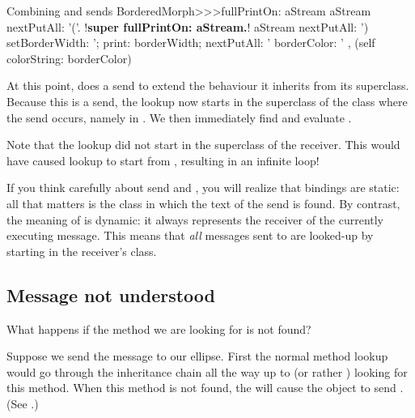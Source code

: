 \documentclass[a4paper,10pt,twoside]{book}
\begin{document}
\begin{method}[fullPrintOn]{Combining \super and \self sends}
BorderedMorph>>>fullPrintOn: aStream
	aStream nextPutAll: '('.
	!\textbf{super fullPrintOn: aStream.}!
	aStream nextPutAll: ') setBorderWidth: '; print: borderWidth;
		nextPutAll: ' borderColor: ' , (self colorString: borderColor)
\end{method}
At this point,  does a \super send to extend the 
 behaviour it inherits from its superclass.
Because this is a \super send, the lookup now starts in the superclass of the class where the \super send occurs, namely in .
We then immediately find and evaluate .

Note that the \super lookup did not start in the superclass of the receiver.
This would have caused lookup to start from , resulting in an infinite loop!


If you think carefully about \super send and , you will realize that \super bindings are static: all that matters is the class in which the text of the \super send is found.
By contrast, the meaning of \self is dynamic: it always represents the receiver of the currently executing message. This means that  \emph{all}  messages sent to \self are looked-up by starting in the receiver's class.

\subsection{Message not understood}

What happens if the method we are looking for is not found?

Suppose we send the message  to our ellipse.
First the normal method lookup would go through the inheritance chain all the way up to  (or rather ) looking for this method.
When this method is not found, the  will cause the object to send .
(See .)
\end{document}
